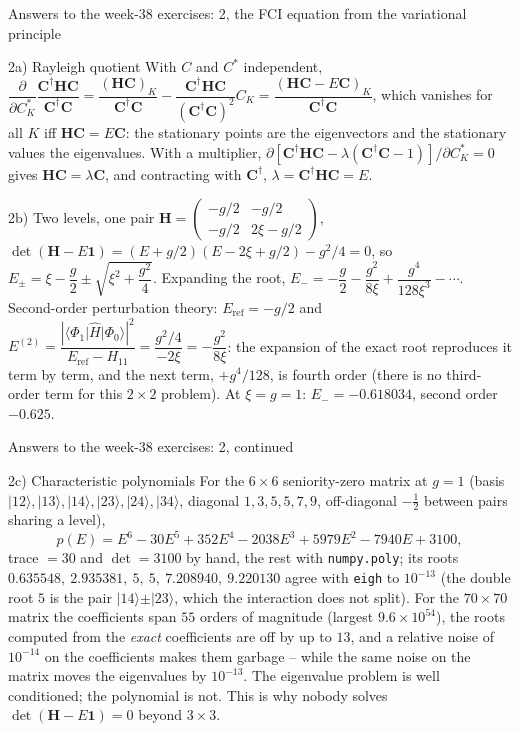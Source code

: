 \documentclass[aspectratio=169,10pt]{beamer}
\newcommand{\ket}[1]{\vert #1\rangle}
\newcommand{\element}[3]{\langle #1\vert #2\vert #3\rangle}
\begin{document}
\begin{frame}{Answers to the week-38 exercises: 2, the FCI equation from the variational principle}
  \footnotesize
  \begin{block}{2a) Rayleigh quotient}
    With $C$ and $C^{*}$ independent, $\dfrac{\partial}{\partial C_K^{*}}\dfrac{\bm{C}^{\dagger}\bm{H}\bm{C}}{\bm{C}^{\dagger}\bm{C}}=\dfrac{(\bm{H}\bm{C})_K}{\bm{C}^{\dagger}\bm{C}}-\dfrac{\bm{C}^{\dagger}\bm{H}\bm{C}}{(\bm{C}^{\dagger}\bm{C})^2}C_K=\dfrac{(\bm{H}\bm{C}-E\bm{C})_K}{\bm{C}^{\dagger}\bm{C}}$, which vanishes for all $K$ iff $\bm{H}\bm{C}=E\bm{C}$: the stationary points are the eigenvectors and the stationary values the eigenvalues. With a multiplier, $\partial[\bm{C}^{\dagger}\bm{H}\bm{C}-\lambda(\bm{C}^{\dagger}\bm{C}-1)]/\partial C_K^{*}=0$ gives $\bm{H}\bm{C}=\lambda\bm{C}$, and contracting with $\bm{C}^{\dagger}$, $\lambda=\bm{C}^{\dagger}\bm{H}\bm{C}=E$.
  \end{block}
  \begin{block}{2b) Two levels, one pair}
    $\bm{H}=\begin{pmatrix}-g/2 & -g/2\\ -g/2 & 2\xi-g/2\end{pmatrix}$, $\det(\bm{H}-E\bm{1})=(E+g/2)(E-2\xi+g/2)-g^2/4=0$, so $E_\pm=\xi-\dfrac{g}{2}\pm\sqrt{\xi^2+\dfrac{g^2}{4}}$. Expanding the root, $E_-=-\dfrac{g}{2}-\dfrac{g^2}{8\xi}+\dfrac{g^4}{128\xi^3}-\cdots$. Second-order perturbation theory: $E_{\mathrm{ref}}=-g/2$ and $E^{(2)}=\dfrac{|\element{\Phi_1}{\hat{H}}{\Phi_0}|^2}{E_{\mathrm{ref}}-H_{11}}=\dfrac{g^2/4}{-2\xi}=-\dfrac{g^2}{8\xi}$: the expansion of the exact root reproduces it term by term, and the next term, $+g^4/128$, is fourth order (there is no third-order term for this $2\times2$ problem). At $\xi=g=1$: $E_-=-0.618034$, second order $-0.625$.
  \end{block}
\end{frame}

\begin{frame}{Answers to the week-38 exercises: 2, continued}
  \footnotesize
  \begin{block}{2c) Characteristic polynomials}
    For the $6\times6$ seniority-zero matrix at $g=1$ (basis $\ket{12},\ket{13},\ket{14},\ket{23},\ket{24},\ket{34}$, diagonal $1,3,5,5,7,9$, off-diagonal $-\frac12$ between pairs sharing a level),
    \[
      p(E)=E^6-30E^5+352E^4-2038E^3+5979E^2-7940E+3100,
    \]
    trace $=30$ and $\det=3100$ by hand, the rest with \texttt{numpy.poly}; its roots $0.635548,\ 2.935381,\ 5,\ 5,\ 7.208940,\ 9.220130$ agree with \texttt{eigh} to $10^{-13}$ (the double root $5$ is the pair $\ket{14}\pm\ket{23}$, which the interaction does not split). For the $70\times70$ matrix the coefficients span $55$ orders of magnitude (largest $9.6\times10^{54}$), the roots computed from the \emph{exact} coefficients are off by up to $13$, and a relative noise of $10^{-14}$ on the coefficients makes them garbage -- while the same noise on the matrix moves the eigenvalues by $10^{-13}$. The eigenvalue problem is well conditioned; the polynomial is not. This is why nobody solves $\det(\bm{H}-E\bm{1})=0$ beyond $3\times3$.
  \end{block}
\end{frame}
\end{document}
